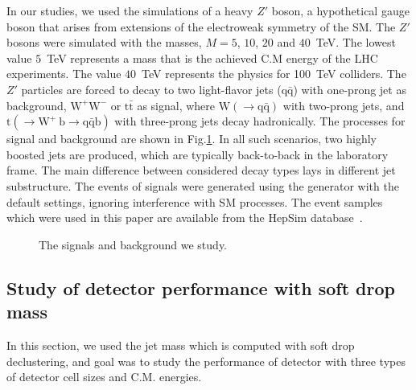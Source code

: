 \documentclass[12pt,twoside,a4paper,an,final]{cms-tdr}
\begin{document}
In our studies, we used the simulations of a heavy $Z'$ boson, a hypothetical gauge boson that arises from extensions of the electroweak symmetry of the SM.
The $Z'$ bosons were simulated with the masses, $M=5$, $10$, $20$ and $40$~TeV. The lowest value $5$~TeV represents a mass that is the achieved C.M energy of the LHC experiments. The value $40$~TeV represents the physics for 100~TeV colliders. The $Z'$ particles are forced to decay to two light-flavor jets ($\mathrm{q\bar{q}}$) with one-prong jet as background, $\mathrm{W^+W^-}$ or $\mathrm{t\bar{t}}$ as signal, where $\mathrm{W(\rightarrow q\bar{q})}$ with two-prong jets, and $\mathrm{t (\rightarrow  W^+\>b \rightarrow q\bar{q} b)}$ with three-prong jets decay hadronically. The processes for signal and background are shown in Fig.\ref{fig:Process_SB}. In all such scenarios, two highly boosted jets are produced, which are typically back-to-back in the laboratory frame. The main difference between considered decay types lays in different jet substructure. The events of signals were generated using the \pythia generator with the default settings, ignoring interference with SM processes. The event samples which were used in this paper are available from the HepSim database~\cite{Chekanov:2014fga}.

\begin{figure}
\begin{center}

\end{center}
\caption{The signals and background we study.}
\label{fig:Process_SB}
\end{figure}

\subsection{Study of detector performance with soft drop mass}
In this section, we used the jet mass which is computed with soft 
drop declustering, and goal was to study the performance of detector with three types of detector 
cell sizes and C.M. energies. 
\end{document}
